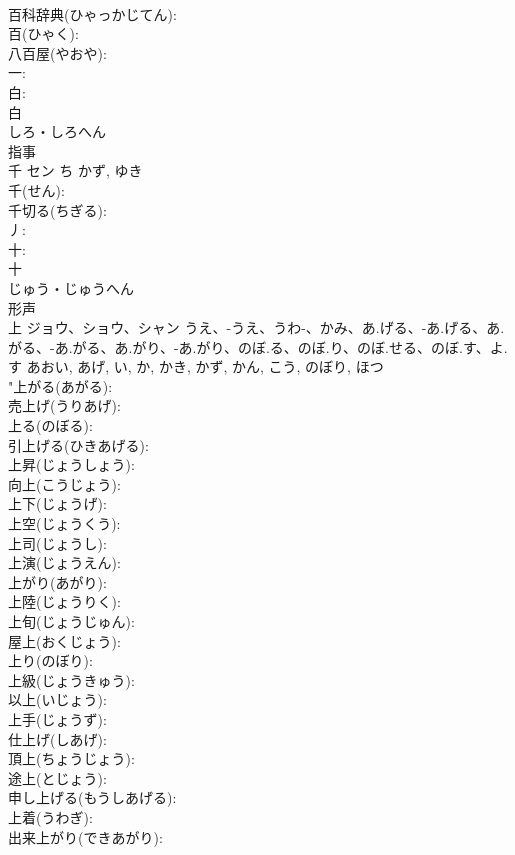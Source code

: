 \documentclass[8pt]{extreport}
\begin{document}
\begin{CJK}{UTF8}{min}
\\	百科辞典(ひゃっかじてん): 
\\	百(ひゃく): 
\\	八百屋(やおや): 
\\	一: 
\\	白: 
\\	白	
\\	しろ・しろへん	
\\	指事 
\\	千	セン	ち	かず, ゆき	
\\	千(せん): 
\\	千切る(ちぎる): 
\\	丿: 
\\	十: 
\\	十	
\\	じゅう・じゅうへん	
\\	形声 
\\	上	ジョウ、ショウ、シャン	うえ、-うえ、うわ-、かみ、あ.げる、-あ.げる、あ.がる、-あ.がる、あ.がり、-あ.がり、のぼ.る、のぼ.り、のぼ.せる、のぼ.す、よ.す	あおい, あげ, い, か, かき, かず, かん, こう, のぼり, ほつ	
\\	"上がる(あがる): 
\\	売上げ(うりあげ): 
\\	上る(のぼる): 
\\	引上げる(ひきあげる): 
\\	上昇(じょうしょう): 
\\	向上(こうじょう): 
\\	上下(じょうげ): 
\\	上空(じょうくう): 
\\	上司(じょうし): 
\\	上演(じょうえん): 
\\	上がり(あがり): 
\\	上陸(じょうりく): 
\\	上旬(じょうじゅん): 
\\	屋上(おくじょう): 
\\	上り(のぼり): 
\\	上級(じょうきゅう): 
\\	以上(いじょう): 
\\	上手(じょうず): 
\\	仕上げ(しあげ): 
\\	頂上(ちょうじょう): 
\\	途上(とじょう): 
\\	申し上げる(もうしあげる): 
\\	上着(うわぎ): 
\\	出来上がり(できあがり): 

\end{CJK}
\end{document}
